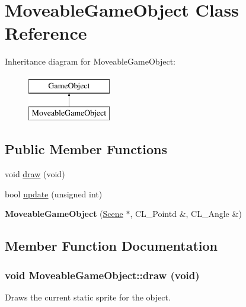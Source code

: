 \hypertarget{classMoveableGameObject}{
\section{MoveableGameObject Class Reference}
\label{classMoveableGameObject}
}
Inheritance diagram for MoveableGameObject:\begin{figure}[H]
\begin{center}
\leavevmode
\includegraphics[height=2cm]{classMoveableGameObject}
\end{center}
\end{figure}
\subsection*{Public Member Functions}
\begin{DoxyCompactItemize}
\item 
void \hyperlink{classMoveableGameObject_a6110e3bcfb088cfaa53bc81ce220bab1}{draw} (void)
\item 
bool \hyperlink{classMoveableGameObject_af2a5d981743e85b4bd35a90f874b361b}{update} (unsigned int)
\item 
\hypertarget{classMoveableGameObject_a5e48acc279c66f1f6b73ad9c37dc4285}{
{\bfseries MoveableGameObject} (\hyperlink{classScene}{Scene} $\ast$, CL\_\-Pointd \&, CL\_\-Angle \&)}
\label{classMoveableGameObject_a5e48acc279c66f1f6b73ad9c37dc4285}

\end{DoxyCompactItemize}


\subsection{Member Function Documentation}
\hypertarget{classMoveableGameObject_a6110e3bcfb088cfaa53bc81ce220bab1}{
\subsubsection[{draw}]{\setlength{\rightskip}{0pt plus 5cm}void MoveableGameObject::draw (void)}}
\label{classMoveableGameObject_a6110e3bcfb088cfaa53bc81ce220bab1}
Draws the current static sprite for the object. 

